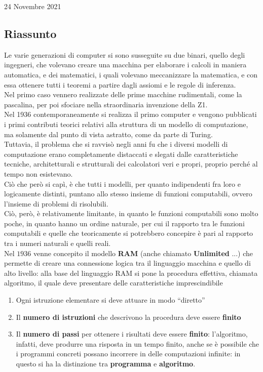 \documentclass[a4paper]{extarticle}
\newcommand{\quotes}[1]{``#1''}
\begin{document}
\newpage
\begin{center}
    24 Novembre 2021
\end{center}
\subsection{Riassunto}
Le varie generazioni di computer si sono susseguite su due binari, quello degli ingegneri, che volevano creare una macchina per elaborare i calcoli in maniera automatica, e dei matematici, i quali volevano meccanizzare la matematica, e con essa ottenere tutti i teoremi a partire dagli assiomi e le regole di inferenza.\\
Nel primo caso vennero realizzate delle prime macchine rudimentali, come la pascalina, per poi sfociare nella straordinaria invenzione della Z1.\\
Nel 1936 contemporaneamente si realizza il primo computer e vengono pubblicati i primi contributi teorici relativi alla struttura di un modello di computazione, ma solamente dal punto di vista astratto, come da parte di Turing.\\
Tuttavia, il problema che si ravvisò negli anni fu che i diversi modelli di computazione erano completamente distaccati e slegati dalle caratteristiche tecniche, architetturali e strutturali dei calcolatori veri e propri, proprio perché al tempo non esistevano.\\
Ciò che però si capì, è che tutti i modelli, per quanto indipendenti fra loro e logicamente distinti, puntano allo stesso insieme di funzioni computabili, ovvero l'insieme di problemi di risolubili.\\
Ciò, però, è relativamente limitante, in quanto le funzioni computabili sono molto poche, in quanto hanno un ordine naturale, per cui il rapporto tra le funzioni computabili e quelle che teoricamente si potrebbero concepire è pari al rapporto tra i numeri naturali e quelli reali.\\
Nel \(1936\) venne concepito il modello \textbf{RAM} (anche chiamato \textbf{Unlimited} ...) che permette di creare una connessione logica tra il linguaggio macchina e quello di alto livello: alla base del linguaggio RAM si pone la procedura effettiva, chiamata algoritmo, il quale deve presentare delle caratteristiche imprescindibile
\begin{enumerate}
    \item Ogni istruzione elementare si deve attuare in modo \quotes{diretto}
    \item Il \textbf{numero di istruzioni} che descrivono la procedura deve essere \textbf{finito}
    \item Il \textbf{numero di passi} per ottenere i risultati deve essere \textbf{finito}: l'algoritmo, infatti, deve produrre una risposta in un tempo finito, anche se è possibile che i programmi concreti possano incorrere in delle computazioni infinite: in questo si ha la distinzione tra \textbf{programma} e \textbf{algoritmo}.
\end{enumerate}
\end{document}
